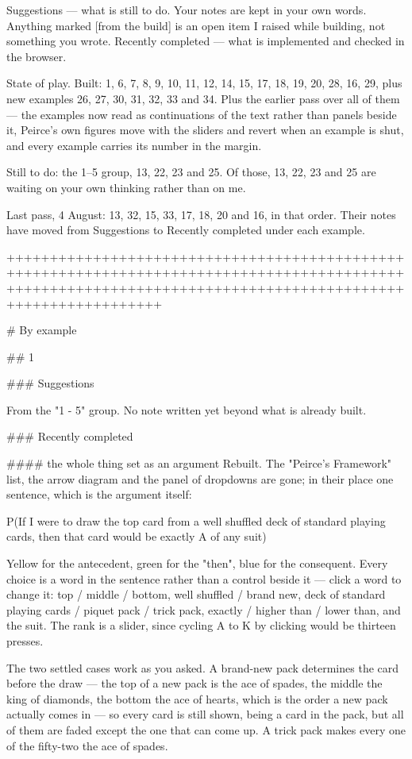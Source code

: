   Suggestions        — what is still to do. Your notes are kept in your own
                       words. Anything marked [from the build] is an open item
                       I raised while building, not something you wrote.
  Recently completed — what is implemented and checked in the browser.

State of play. Built: 1, 6, 7, 8, 9, 10, 11, 12, 14, 15, 17, 18, 19, 20, 28,
16, 29, plus new examples 26, 27, 30, 31, 32, 33 and 34.
Plus the earlier pass over all of them — the examples now read as continuations
of the text rather than panels beside it, Peirce's own figures move with the
sliders and revert when an example is shut, and every example carries its number
in the margin.

Still to do: the 1–5 group, 13, 22, 23 and 25. Of those, 13, 22, 23 and 25 are
waiting on your own thinking rather than on me.

Last pass, 4 August: 13, 32, 15, 33, 17, 18, 20 and 16, in that order. Their
notes have moved from Suggestions to Recently completed under each example.


++++++++++++++++++++++++++++++++++++++++++++++++++++++++++++++++++++++++++++++++++++++++++++++++++++++++++++++++++++++++++++++++++++++++++++++++++++++++++++

# By example


## 1

### Suggestions

From the "1 - 5" group. No note written yet beyond what is already built.

### Recently completed

#### the whole thing set as an argument
Rebuilt. The "Peirce's Framework" list, the arrow diagram and the panel of
dropdowns are gone; in their place one sentence, which is the argument itself:

  P(If I were to draw the top card from a well shuffled deck of standard
  playing cards, then that card would be exactly A of any suit)

Yellow for the antecedent, green for the "then", blue for the consequent. Every
choice is a word in the sentence rather than a control beside it — click a word
to change it: top / middle / bottom, well shuffled / brand new, deck of standard
playing cards / piquet pack / trick pack, exactly / higher than / lower than,
and the suit. The rank is a slider, since cycling A to K by clicking would be
thirteen presses.

The two settled cases work as you asked. A brand-new pack determines the card
before the draw — the top of a new pack is the ace of spades, the middle the
king of diamonds, the bottom the ace of hearts, which is the order a new pack
actually comes in — so every card is still shown, being a card in the pack, but
all of them are faded except the one that can come up. A trick pack makes every
one of the fifty-two the ace of spades.

